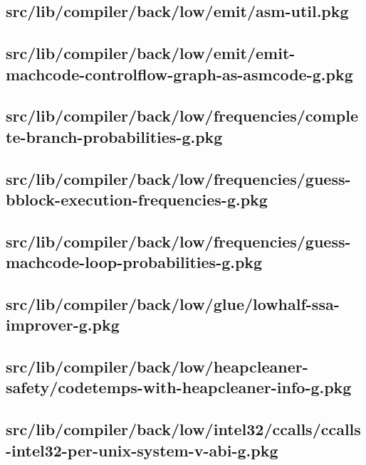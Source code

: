 \subsection{src/lib/compiler/back/low/emit/asm-util.pkg}


\subsection{src/lib/compiler/back/low/emit/emit-machcode-controlflow-graph-as-asmcode-g.pkg}


\subsection{src/lib/compiler/back/low/frequencies/complete-branch-probabilities-g.pkg}


\subsection{src/lib/compiler/back/low/frequencies/guess-bblock-execution-frequencies-g.pkg}


\subsection{src/lib/compiler/back/low/frequencies/guess-machcode-loop-probabilities-g.pkg}


\subsection{src/lib/compiler/back/low/glue/lowhalf-ssa-improver-g.pkg}


\subsection{src/lib/compiler/back/low/heapcleaner-safety/codetemps-with-heapcleaner-info-g.pkg}


\subsection{src/lib/compiler/back/low/intel32/ccalls/ccalls-intel32-per-unix-system-v-abi-g.pkg}


